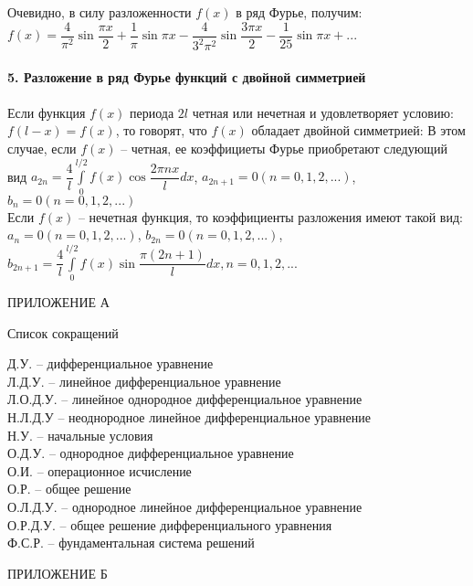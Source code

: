 \documentclass{article}
\numberwithin{equation}{section}
\begin{document}
Очевидно, в силу разложенности $f(x)$ в ряд Фурье, получим:\\
$f(x)=\dfrac{4}{\pi^2}\sin\dfrac{\pi x}{2}+\dfrac{1}{\pi}\sin\pi x-\dfrac{4}{3^2\pi^2}\sin\dfrac{3\pi x}{2}-\dfrac{1}{25}\sin\pi x+...$
\\\\
\textbf{5. Разложение в ряд Фурье функций с двойной симметрией}
\\\\
Если функция $f(x)$ периода $2l$ четная или нечетная и удовлетворяет условию: $f(l-x)=f(x)$, то говорят, что $f(x)$ обладает двойной симметрией: В этом случае, если $f(x)$ -- четная, ее коэффициеты Фурье приобретают следующий вид $a_{2n}=\dfrac{4}{l}\int\limits_0^{l/2}f(x)\cos\dfrac{2\pi nx}{l}dx$, $a_{2n+1}=0(n=0,1,2,...)$, $b_n=0(n=0,1,2,...)$\\
Если $f(x)$ -- нечетная функция, то коэффициенты разложения имеют такой вид: $a_n=0(n=0,1,2,...)$, $b_{2n}=0(n=0,1,2,...)$, $b_{2n+1}=\dfrac{4}{l}\int\limits_0^{l/2}f(x)\sin\dfrac{\pi(2n+1)}{l}dx,n=0,1,2,...$
\newpage
\begin{flushright}
ПРИЛОЖЕНИЕ А
\end{flushright}
\begin{center}
Список сокращений
\end{center}
Д.У. -- дифференциальное уравнение\\
Л.Д.У. -- линейное дифференциальное уравнение\\
Л.О.Д.У. -- линейное однородное дифференциальное уравнение\\
Н.Л.Д.У -- неоднородное линейное дифференциальное уравнение\\
Н.У. -- начальные условия\\
О.Д.У. -- однородное дифференциальное уравнение\\
О.И. -- операционное исчисление\\
О.Р. -- общее решение\\
О.Л.Д.У. -- однородное линейное дифференциальное уравнение\\
О.Р.Д.У. -- общее решение дифференциального уравнения\\
Ф.С.Р. -- фундаментальная система решений\\
\newpage
\begin{flushright}
ПРИЛОЖЕНИЕ Б
\end{flushright}
\end{document}
